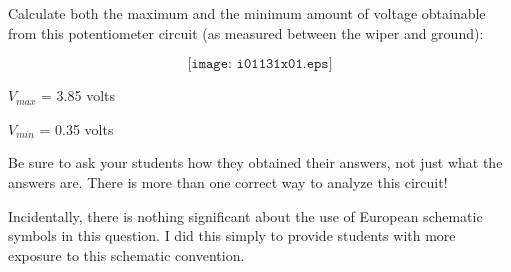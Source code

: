 

Calculate both the maximum and the minimum amount of voltage obtainable from this potentiometer circuit (as measured between the wiper and ground):

$$\texttt{[image: i01131x01.eps]}$$







$V_{max}$ = 3.85 volts

\vskip 10pt

$V_{min}$ = 0.35 volts







Be sure to ask your students how they obtained their answers, not just what the answers are.  There is more than one correct way to analyze this circuit!

Incidentally, there is nothing significant about the use of European schematic symbols in this question.  I did this simply to provide students with more exposure to this schematic convention.





